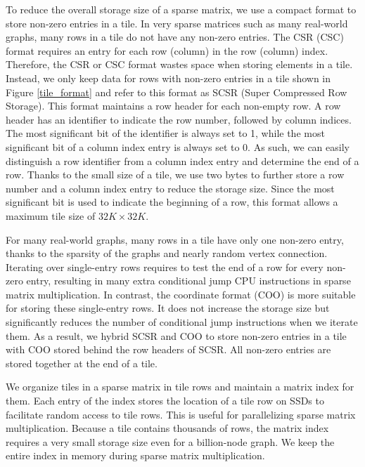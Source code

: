 To reduce the overall storage size of a sparse matrix, we use a compact format
to store non-zero entries in a tile. In very sparse matrices such as
many real-world graphs, many rows in a tile do not have any non-zero entries.
The CSR (CSC) format requires an entry for each row (column) in the row
(column) index. Therefore, the CSR or CSC format wastes space when storing elements
in a tile. Instead, we only keep data for rows with non-zero entries in a tile
shown in Figure \ref{tile_format} and refer to this format as SCSR (Super
Compressed Row Storage). This format maintains a row header for each non-empty
row. A row header has an identifier to indicate the row number, followed by
column indices. 
The most significant bit of the identifier is always set to 1, while the most
significant bit of a column index entry is always set to 0. As such, we can easily
distinguish a row identifier from a column index entry and determine the end
of a row. Thanks to the small size of a tile, we use two bytes to further store a row
number and a column index entry to reduce the storage size. Since the most
significant bit is used to indicate the beginning of a row, this format allows
a maximum tile size of $32K \times 32K$.

For many real-world graphs, many rows in a tile have only one non-zero entry,
thanks to the sparsity of the graphs and nearly random vertex connection.
Iterating over single-entry rows requires to test the end of a row for every
non-zero entry, resulting in many extra conditional jump CPU instructions
in sparse matrix multiplication.
In contrast, the coordinate format (COO) is more suitable for storing these
single-entry rows. It does not increase the storage size but significantly
reduces the number of conditional jump instructions when we iterate
them. As a result, we hybrid SCSR and COO to store non-zero entries in a tile
with COO stored behind the row headers of SCSR. All non-zero entries are
stored together at the end of a tile.

We organize tiles in a sparse matrix in tile rows and maintain a matrix index
for them. Each entry of the index stores the location of a tile row on SSDs
to facilitate random access
to tile rows. This is useful for parallelizing sparse matrix multiplication.
Because a tile contains thousands of rows, the matrix index requires a very
small storage size even for a billion-node graph. We keep the entire index
in memory during sparse matrix multiplication.

